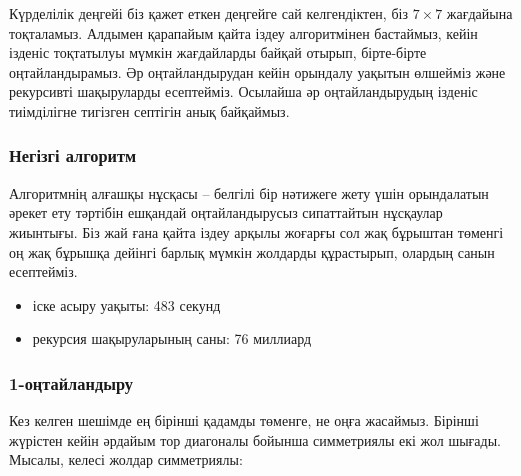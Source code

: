Күрделілік деңгейі біз қажет еткен деңгейге сай келгендіктен, біз $7 \times 7$ жағдайына тоқталамыз.
Алдымен қарапайым қайта іздеу алгоритмінен бастаймыз, кейін 
ізденіс тоқтатылуы мүмкін жағдайларды байқай отырып, бірте-бірте оңтайландырамыз.
Әр оңтайландырудан кейін орындалу уақытын өлшейміз және
рекурсивті шақыруларды есептейміз. Осылайша әр оңтайландырудың
ізденіс тиімділігне тигізген септігін анық байқаймыз.

\subsubsection{Негізгі алгоритм}

Алгоритмнің алғашқы нұсқасы --  белгілі бір нәтижеге жету үшін орындалатын әрекет ету тәртібін ешқандай оңтайландырусыз сипаттайтын нұсқаулар жиынтығы.
Біз жай ғана қайта іздеу арқылы жоғарғы сол жақ бұрыштан
төменгі оң жақ бұрышқа дейінгі барлық мүмкін жолдарды құрастырып,
олардың санын есептейміз.

\begin{itemize}
\item
іске асыру уақыты: 483 секунд
\item
рекурсия шақыруларының саны: 76 миллиард
\end{itemize}

\subsubsection{1-оңтайландыру}

Кез келген шешімде ең бірінші қадамды төменге, не  
оңға жасаймыз.
Бірінші жүрістен кейін әрдайым тор диагоналы бойынша
симметриялы екі жол шығады.
Мысалы, келесі жолдар симметриялы:


